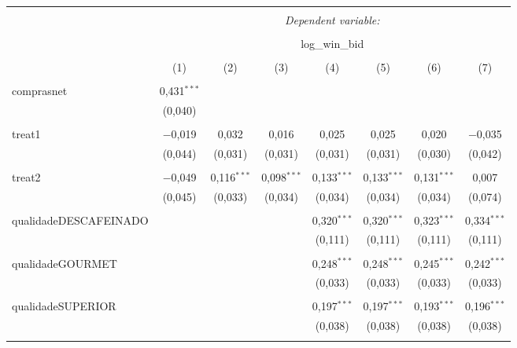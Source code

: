 
\begin{table}[!htbp] \centering 
  \caption{} 
  \label{} 
\begin{tabular}{@{\extracolsep{5pt}}lccccccc} 
\\[-1.8ex]\hline 
\hline \\[-1.8ex] 
 & \multicolumn{7}{c}{\textit{Dependent variable:}} \\ 
\cline{2-8} 
\\[-1.8ex] & \multicolumn{7}{c}{log\_win\_bid} \\ 
\\[-1.8ex] & (1) & (2) & (3) & (4) & (5) & (6) & (7)\\ 
\hline \\[-1.8ex] 
 comprasnet & 0,431$^{***}$ &  &  &  &  &  &  \\ 
  & (0,040) &  &  &  &  &  &  \\ 
  & & & & & & & \\ 
 treat1 & $-$0,019 & 0,032 & 0,016 & 0,025 & 0,025 & 0,020 & $-$0,035 \\ 
  & (0,044) & (0,031) & (0,031) & (0,031) & (0,031) & (0,030) & (0,042) \\ 
  & & & & & & & \\ 
 treat2 & $-$0,049 & 0,116$^{***}$ & 0,098$^{***}$ & 0,133$^{***}$ & 0,133$^{***}$ & 0,131$^{***}$ & 0,007 \\ 
  & (0,045) & (0,033) & (0,034) & (0,034) & (0,034) & (0,034) & (0,074) \\ 
  & & & & & & & \\ 
 qualidadeDESCAFEINADO &  &  &  & 0,320$^{***}$ & 0,320$^{***}$ & 0,323$^{***}$ & 0,334$^{***}$ \\ 
  &  &  &  & (0,111) & (0,111) & (0,111) & (0,111) \\ 
  & & & & & & & \\ 
 qualidadeGOURMET &  &  &  & 0,248$^{***}$ & 0,248$^{***}$ & 0,245$^{***}$ & 0,242$^{***}$ \\ 
  &  &  &  & (0,033) & (0,033) & (0,033) & (0,033) \\ 
  & & & & & & & \\ 
 qualidadeSUPERIOR &  &  &  & 0,197$^{***}$ & 0,197$^{***}$ & 0,193$^{***}$ & 0,196$^{***}$ \\ 
  &  &  &  & (0,038) & (0,038) & (0,038) & (0,038) \\ 
  & & & & & & & \\ 

\end{tabular}
\end{table}
